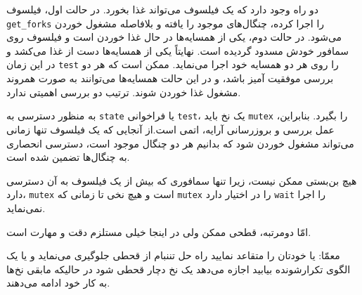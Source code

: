 \documentclass{book}
\begin{document}
    دو راه وجود دارد که یک فیلسوف می‌تواند غذا بخورد. در حالت اول، فیلسوف {\tt get\_forks} را اجرا کرده، چنگال‌های موجود را یافته و 
    بلافاصله مشغول خوردن می‌شود. در حالت دوم، یکی از همسایه‌ها در حال غذا خوردن است و فیلسوف روی سمافور خودش مسدود گردیده است. 
    نهایتاً یکی از همسایه‌ها دست از غذا می‌کشد و در این زمان  {\tt test} را روی هر دو همسایه خود اجرا می‌نماید. 
    ممکن است که هر دو بررسی موفقیت آمیز باشد، و در این حالت همسایه‌ها می‌توانند به صورت همروند مشغول غذا خوردن شوند. 
    ترتیب دو بررسی اهمیتی ندارد. 

    به منظور دسترسی به {\tt state} یا فراخوانی {\tt test}، یک نخ باید {\tt mutex} را بگیرد. 
    بنابراین، عمل بررسی و بروزرسانی آرایه، اتمی است.از آنجایی که یک فیلسوف تنها زمانی می‌تواند مشغول خوردن شود که بدانیم هر دو چنگال موجود است، 
    دسترسی انحصاری به چنگال‌ها تضمین شده است. 

    هیچ بن‌بستی ممکن نیست، زیرا تنها سمافوری که بیش از یک فیلسوف به آن دسترسی دارد، {\tt mutex} است و هیچ نخی  
    تا زمانی که {\tt mutex} را در اختیار دارد {\tt wait} را اجرا نمی‌نماید. 

    امّا دومرتبه، قطحی ممکن ولی در اینجا خیلی مستلزم دقت و مهارت است.

    معمّا: یا خودتان را متقاعد نمایید راه حل تننبام از قحطی جلوگیری می‌نماید و یا یک الگوی تکرارشونده بیابید اجازه می‌دهد یک نخ دچار قحطی شود 
    در حالیکه مابقی نخ‌ها به کار خود ادامه می‌دهند. 
\end{document}
